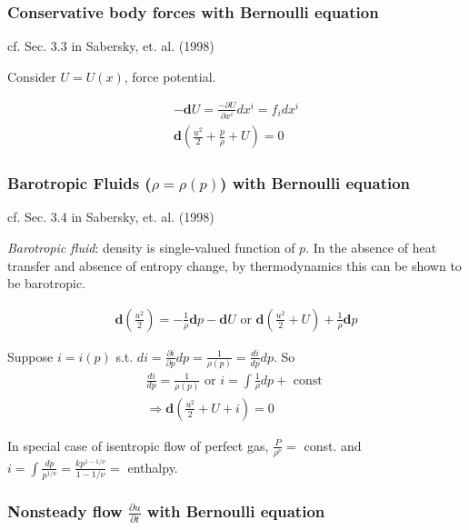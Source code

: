 \documentclass[twoside,landscape,10pt]{amsart}
\theoremstyle{plain}
\theoremstyle{definition}
\theoremstyle{remark}
\theoremstyle{remark}
\begin{document}
\begin{multicols*}{2}
\subsubsection{Conservative body forces with Bernoulli equation}

cf. Sec. 3.3 in Sabersky, et. al. (1998) \cite{SAHG1998}

Consider $U= U(x)$, force potential. 

\[
\begin{gathered}
-\mathbf{d}U = \frac{ - \partial U}{\partial x^i} dx^i = f_i dx^i \\
\mathbf{d}\left( \frac{u^2}{2} + \frac{p}{\rho} + U \right) = 0 
\end{gathered}
\]

\subsubsection{Barotropic Fluids ($\rho = \rho(p)$) with Bernoulli equation}

cf. Sec. 3.4 in Sabersky, et. al. (1998) \cite{SAHG1998}

\emph{Barotropic fluid}: density is single-valued function of $p$. In the absence of heat transfer and absence of entropy change, by thermodynamics this can be shown to be barotropic.

\[
\begin{gathered}
\mathbf{d} \left( \frac{u^2}{2} \right) = -\frac{1}{\rho} \mathbf{d}p - \mathbf{d}U \text{ or } \mathbf{d} \left( \frac{u^2}{2} + U \right) + \frac{1}{\rho} \mathbf{d}p
\end{gathered}
\]

Suppose $i=i(p)$ s.t. $di = \frac{\partial i}{\partial p} dp = \frac{1}{\rho (p)} = \frac{di}{dp} dp$. So
\[
\begin{gathered}
\frac{di}{dp} = \frac{1}{\rho(p)} \text{ or } i = \int \frac{1}{\rho} dp + \text{ const } \\
\Longrightarrow \mathbf{d} \left( \frac{u^2}{2} + U + i \right) = 0 
\end{gathered}
\]

In special case of isentropic flow of perfect gas, $\frac{P}{\rho^{\nu}} = $ const. and $ i =\int \frac{dp}{p^{1/\nu}} = \frac{kp^{1-1/\nu}}{1- 1/\nu} = $ enthalpy.

\subsubsection{Nonsteady flow $\frac{\partial u}{\partial t}$ with Bernoulli equation}


\end{multicols*}
\end{document}
